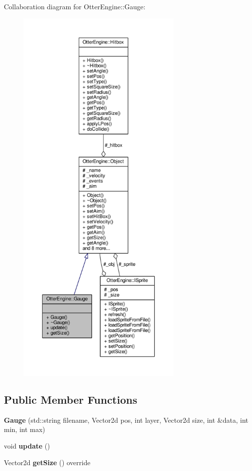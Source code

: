 Collaboration diagram for Otter\+Engine\+:\+:Gauge\+:\nopagebreak
\begin{figure}[H]
\begin{center}
\leavevmode
\includegraphics[height=550pt]{da/d94/class_otter_engine_1_1_gauge__coll__graph}
\end{center}
\end{figure}
\subsection*{Public Member Functions}
\begin{DoxyCompactItemize}
\item 
{\bfseries Gauge} (std\+::string filename, Vector2d pos, int layer, Vector2d size, int \&data, int min, int max)\hypertarget{class_otter_engine_1_1_gauge_a5b20ae005ad67d3d691f07f092e070f6}{}\label{class_otter_engine_1_1_gauge_a5b20ae005ad67d3d691f07f092e070f6}

\item 
void {\bfseries update} ()\hypertarget{class_otter_engine_1_1_gauge_a0bd45834bd1c4914f95ea9fee2c9d7bd}{}\label{class_otter_engine_1_1_gauge_a0bd45834bd1c4914f95ea9fee2c9d7bd}

\item 
Vector2d {\bfseries get\+Size} () override\hypertarget{class_otter_engine_1_1_gauge_a02d694402df6053a6db65bc761505f6a}{}\label{class_otter_engine_1_1_gauge_a02d694402df6053a6db65bc761505f6a}

\end{DoxyCompactItemize}
